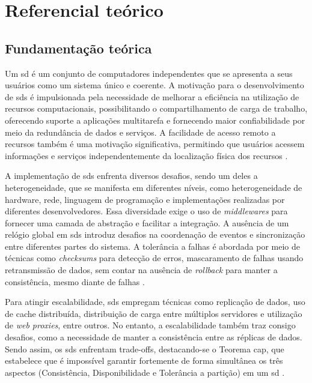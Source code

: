 \chapter{Referencial teórico}
\label{cap:referencialTeorico}

\section{Fundamentação teórica}
\label{section:background}

Um \gls{sd} é um conjunto de computadores independentes que se apresenta a seus usuários como um sistema único e coerente. A motivação para o desenvolvimento de \gls{sds} é impulsionada pela necessidade de melhorar a eficiência na utilização de recursos computacionais, possibilitando o compartilhamento de carga de trabalho, oferecendo suporte a aplicações multitarefa e fornecendo maior confiabilidade por meio da redundância de dados e serviços. A facilidade de acesso remoto a recursos também é uma motivação significativa, permitindo que usuários acessem informações e serviços independentemente da localização física dos recursos \cite{TanenbaumDistributedSystemsThirdEdition}.

A implementação de \gls{sds} enfrenta diversos desafios, sendo um deles a heterogeneidade, que se manifesta em diferentes níveis, como heterogeneidade de hardware, rede, linguagem de programação e implementações realizadas por diferentes desenvolvedores. Essa diversidade exige o uso de \textit{middlewares} para fornecer uma camada de abstração e facilitar a integração. A ausência de um relógio global em \gls{sds} introduz desafios na coordenação de eventos e sincronização entre diferentes partes do sistema. A tolerância a falhas é abordada por meio de técnicas como \textit{checksums} para detecção de erros, mascaramento de falhas usando retransmissão de dados, sem contar na ausência de \textit{rollback} para manter a consistência, mesmo diante de falhas \cite{DistributedSystemsCoulouris}.

Para atingir escalabilidade, \gls{sds} empregam técnicas como replicação de dados, uso de cache distribuída, distribuição de carga entre múltiplos servidores e utilização de \textit{web proxies}, entre outros. No entanto, a escalabilidade também traz consigo desafios, como a necessidade de manter a consistência entre as réplicas de dados. Sendo assim, os \gls{sds} enfrentam trade-offs, destacando-se o Teorema \gls{cap}, que estabelece que é impossível garantir fortemente de forma simultânea os três aspectos (Consistência, Disponibilidade e Tolerância a partição) em um \gls{sd} \cite{TwentyYearsLaterEricBrewer2012}.

